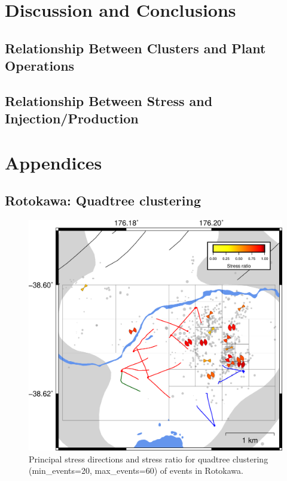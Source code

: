 \section{Discussion and Conclusions}
\subsection{Relationship Between Clusters and Plant Operations}
\subsection{Relationship Between Stress and Injection/Production}

\section{Appendices}
\subsection{Rotokawa: Quadtree clustering}

\begin{figure}[h!]
\begin{center}
\includegraphics[width=0.84\columnwidth]{Chapter_5_FMs/figures/merc_Rot_qtree_clust_cents_sigmas/merc_Rot_qtree_clust_cents_SHmax_original}
\caption{{Principal stress directions and stress ratio for quadtree clustering
(min\_events=20, max\_events=60) of events in Rotokawa.
{\label{181502}}%
}}
\end{center}
\end{figure}

